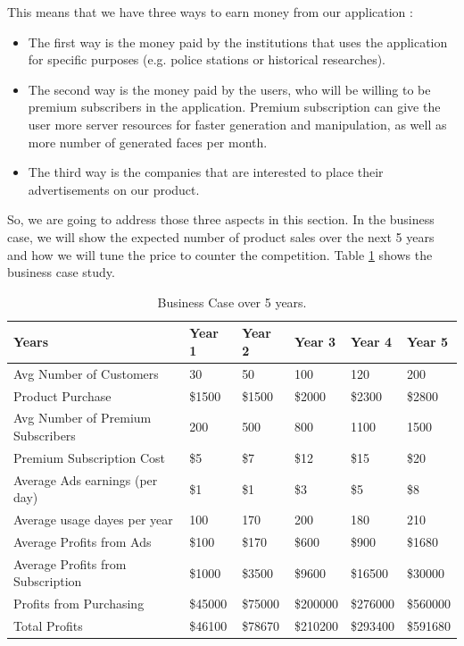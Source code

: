 This means that we have three ways to earn money from our application :
\begin{itemize}
    \item The first way is the money paid by the institutions that uses the application for specific purposes (e.g. police stations or historical researches).
    \item The second way is the money paid by the users, who will be willing to be premium subscribers in the application. Premium subscription can give the user more server resources for faster generation and manipulation, as well as more number of generated faces per month.
    \item The third way is the companies that are interested to place their advertisements on our product.
\end{itemize}

So, we are going to address those three aspects in this section. In the business case, we will show the expected number of product sales over the next 5 years and how we will tune the price to counter the competition. Table \ref{tab:business} shows the business case study.

\begin{table}[H]
\centering
\caption{Business Case over 5 years.}
\begin{tabular}[t]{| l | l | l | l | l | l |}
\hline
Years & Year 1 & Year 2 & Year 3 & Year 4 & Year 5 \\
\hline
Avg Number of Customers & 30 & 50 & 100 & 120 & 200 \\
\hline
Product Purchase & \$1500 & \$1500 & \$2000 & \$2300 & \$2800 \\
\hline
Avg Number of Premium Subscribers & 200 & 500 & 800 & 1100 & 1500 \\
\hline
Premium Subscription Cost & \$5 & \$7 & \$12 & \$15 & \$20 \\
\hline
Average Ads earnings (per day) & \$1 & \$1 & \$3 & \$5 & \$8 \\
\hline
Average usage dayes per year & 100 & 170 & 200 & 180 & 210 \\
\hline
Average Profits from Ads & \$100 & \$170 & \$600 & \$900 & \$1680 \\
\hline
Average Profits from Subscription & \$1000 & \$3500 & \$9600 & \$16500 & \$30000 \\
\hline
Profits from Purchasing & \$45000 & \$75000 & \$200000 & \$276000 & \$560000 \\
\hline
Total Profits & \$46100 & \$78670 & \$210200 & \$293400 & \$591680 \\
\hline
\end{tabular}
\label{tab:business}
\end{table}


